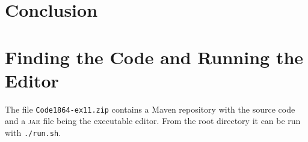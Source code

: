 \documentclass[a4paper,draft,12pt,oneside,article,table]{memoir}
\begin{document}
\chapter{Conclusion}

\appendix

\chapter{Finding the Code and Running the Editor}

The file \texttt{Code1864-ex11.zip} contains a Maven repository with the source
code and a \textsc{jar} file being the executable editor. From the
root directory it can be run with \texttt{./run.sh}.

\end{document}
